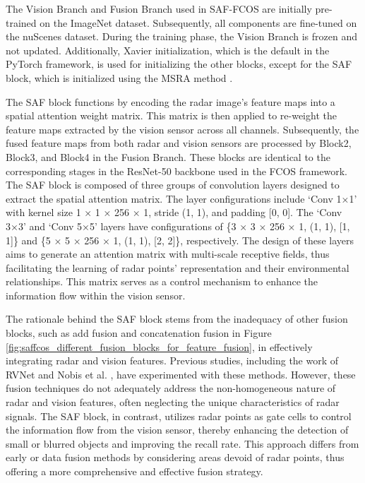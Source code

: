 \documentclass[report.tex]{subfiles}
\begin{document}
    The Vision Branch and Fusion Branch used in SAF-FCOS are initially pre-trained on the ImageNet \cite{russakovsky2015imagenet} dataset. Subsequently, all components are fine-tuned on the nuScenes \cite{caesar2020nuscenes} dataset. During the training phase, the Vision Branch is frozen and not updated. Additionally, Xavier initialization, which is the default in the PyTorch framework, is used for initializing the other blocks, except for the SAF block, which is initialized using the MSRA method \cite{he2015delving}.

    The SAF block functions by encoding the radar image's feature maps into a spatial attention weight matrix. This matrix is then applied to re-weight the feature maps extracted by the vision sensor across all channels. Subsequently, the fused feature maps from both radar and vision sensors are processed by Block2, Block3, and Block4 in the Fusion Branch. These blocks are identical to the corresponding stages in the ResNet-50 backbone used in the FCOS \cite{tian2019fcos} framework. The SAF block is composed of three groups of convolution layers designed to extract the spatial attention matrix. The layer configurations include `Conv 1×1' with kernel size 1 × 1 × 256 × 1, stride (1, 1), and padding [0, 0]. The `Conv 3×3' and `Conv 5×5' layers have configurations of \{3 × 3 × 256 × 1, (1, 1), [1, 1]\} and \{5 × 5 × 256 × 1, (1, 1), [2, 2]\}, respectively. The design of these layers aims to generate an attention matrix with multi-scale receptive fields, thus facilitating the learning of radar points' representation and their environmental relationships. This matrix serves as a control mechanism to enhance the information flow within the vision sensor.

    The rationale behind the SAF block stems from the inadequacy of other fusion blocks, such as add fusion and concatenation fusion in Figure \ref{fig:saffcos_different_fusion_blocks_for_feature_fusion}, in effectively integrating radar and vision features. Previous studies, including the work of RVNet \cite{john2019rvnet} and Nobis et al. \cite{nobis2019deep}, have experimented with these methods. However, these fusion techniques do not adequately address the non-homogeneous nature of radar and vision features, often neglecting the unique characteristics of radar signals. The SAF block, in contrast, utilizes radar points as gate cells to control the information flow from the vision sensor, thereby enhancing the detection of small or blurred objects and improving the recall rate. This approach differs from early or data fusion methods by considering areas devoid of radar points, thus offering a more comprehensive and effective fusion strategy.
\end{document}
